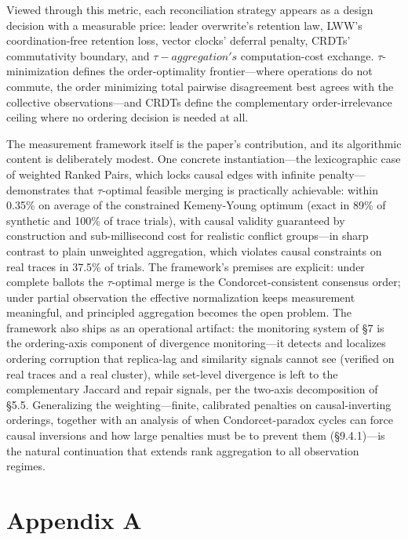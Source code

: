 \documentclass[11pt]{article}
\begin{document}
Viewed through this metric, each reconciliation strategy appears as a design decision with a measurable price: leader overwrite's retention law, LWW's coordination-free retention loss, vector clocks' deferral penalty, CRDTs' commutativity boundary, and $\tau -aggregation's$ computation-cost exchange. $\tau $-minimization defines the order-optimality frontier—where operations do not commute, the order minimizing total pairwise disagreement best agrees with the collective observations—and CRDTs define the complementary order-irrelevance ceiling where no ordering decision is needed at all.

The measurement framework itself is the paper's contribution, and its algorithmic content is deliberately modest. One concrete instantiation—the lexicographic case of weighted Ranked Pairs, which locks causal edges with infinite penalty—demonstrates that $\tau $-optimal feasible merging is practically achievable: within 0.35\% on average of the constrained Kemeny-Young optimum (exact in 89\% of synthetic and 100\% of trace trials), with causal validity guaranteed by construction and sub-millisecond cost for realistic conflict groups—in sharp contrast to plain unweighted aggregation, which violates causal constraints on real traces in 37.5\% of trials. The framework's premises are explicit: under complete ballots the $\tau $-optimal merge is the Condorcet-consistent consensus order; under partial observation the effective normalization keeps measurement meaningful, and principled aggregation becomes the open problem. The framework also ships as an operational artifact: the monitoring system of §7 is the ordering-axis component of divergence monitoring—it detects and localizes ordering corruption that replica-lag and similarity signals cannot see (verified on real traces and a real cluster), while set-level divergence is left to the complementary Jaccard and repair signals, per the two-axis decomposition of §5.5. Generalizing the weighting—finite, calibrated penalties on causal-inverting orderings, together with an analysis of when Condorcet-paradox cycles can force causal inversions and how large penalties must be to prevent them (§9.4.1)—is the natural continuation that extends rank aggregation to all observation regimes.

\appendix
\section*{Appendix A}
\end{document}
